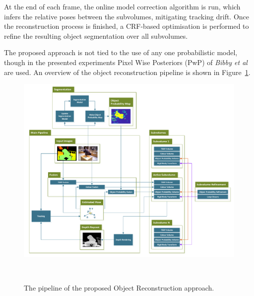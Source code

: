 At the end of each frame, the online model correction algorithm is run, which
infers the relative poses between the subvolumes, mitigating tracking drift.
Once the reconstruction process is finished, a CRF-based optimisation is 
performed to refine the resulting object segmentation over all subvolumes.

The proposed approach is not tied to the use of any one probabilistic model,
though in the presented experiments Pixel Wise Posteriors (PwP) of \textit{Bibby et al} 
~\cite{Bibby2008} are used. An overview of the object reconstruction pipeline is shown in
Figure~\ref{figure:probobj_pipeline_diagram}.

\begin{figure}[!htbp]
  \centering
  \includegraphics[width=0.9\linewidth]{figures/object_recon/pipeline.pdf}
  \caption[Probabilistic Object Reconstruction Pipeline]
  {The pipeline of the proposed Object Reconstruction approach.}
~\label{figure:probobj_pipeline_diagram}
\end{figure}

